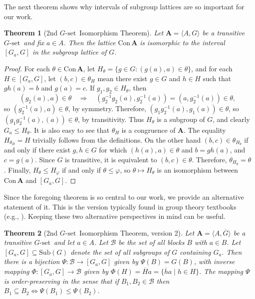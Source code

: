 \documentclass[cm,dissertation,actual,final]{uhthesis}
\theoremstyle{plain}
\newtheorem{theorem}{Theorem}[section]
\theoremstyle{definition}
\theoremstyle{remark}
\numberwithin{theorem}{section}
\numberwithin{claim}{chapter}
\numberwithin{equation}{section}
\numberwithin{conjecture}{chapter}
\newcommand{\<}{\ensuremath{\langle}}
\renewcommand{\>}{\ensuremath{\rangle}}
\renewcommand{\leq}{\ensuremath{\leqslant}}
\newcommand{\Con}{\ensuremath{\mathrm{Con\,}}}
\newcommand{\Sub}{\ensuremath{\mathrm{Sub}}}
\newcommand{\0}{\ensuremath{\mathbf{0}}}
\newcommand{\1}{\ensuremath{\mathbf{1}}}
\newcommand{\2}{\ensuremath{\mathbf{2}}}
\newcommand{\3}{\ensuremath{\mathbf{3}}}
\newcommand{\4}{\ensuremath{\mathbf{4}}}
\newcommand{\5}{\ensuremath{\mathbf{5}}}
\newcommand{\bA}{\ensuremath{\mathbf{A}}}
\newcommand{\sB}{\ensuremath{\mathscr{B}}}
\newcommand{\barG}{\ensuremath{\overline{G}}}
\newcommand{\barH}{\ensuremath{\overline{H}}}
\newcommand{\barh}{\ensuremath{\overline{h}}}
\newcommand{\stab}[1]{\ensuremath{G_{#1}}}
\newcommand{\Gset}{\ensuremath{G\text{-set}}}
\renewcommand{\phi}{\ensuremath{\varphi}}
\begin{document}
The next theorem shows why intervals of subgroup lattices are so important for
our work.
\begin{theorem}[2nd \Gset\ Isomorphism Theorem]
\label{thm:g-set-isomorphism2}
  Let $\bA = \<A, G\>$ be a transitive \Gset\ and fix $a\in A$.  
  Then the lattice $\Con \bA$ is isomorphic to the
  interval $[G_a, G]$ in the subgroup lattice of $G$.
\end{theorem}
\begin{proof}
    For each $\theta  \in \Con \bA$, let $H_\theta =\{g\in G : (g(a),a) \in
    \theta\}$,  
    and for each $H \in [G_a, G]$, let 
    $(b, c) \in \theta_H$ mean there exist $g \in G$ and $h \in H$ 
    such that $gh(a) = b$ and $g(a) =c$. 
    If $g_1, g_2 \in H_\theta$, then 
    \[
    (g_2(a), a) \in \theta \quad \Rightarrow \quad (g_2^{-1} g_2(a), g_2^{-1}(a)) =
    (a, g_2^{-1}(a)) \in \theta,
    \]
    so $(g_2^{-1}(a), a) \in \theta$, by symmetry.  Therefore,
    $(g_1g_2^{-1} (a), g_1 (a)) \in \theta$, so 
    $(g_1g_2^{-1} (a), (a)) \in \theta$, by transitivity. Thus $H_\theta$ is a
    subgroup of 
    $G$, and clearly  $G_a \leq H_\theta$. 
    It is also easy to see that $\theta_H$ is a congruence of $\bA$.
    The equality $H_{\theta_H}=H$ trivially follows from the definitions. 
    On the other hand $(b, c) \in \theta_{H_\theta}$ if and only if there exist 
    $g, h\in G$ for which $(h(a),a) \in \theta$ and
    $b = gh(a)$, and $c = g(a)$. Since $G$ is transitive, it is equivalent 
    to $(b, c) \in \theta$.
    Therefore, $\theta_{H_\theta} = \theta$. Finally, $H_\theta \leq H_\phi$ if
    and only if
    $\theta \leq \phi$, so $\theta \mapsto H_\theta$ is an isomorphism
    between $\Con \bA$ and $[G_a, G]$.
\end{proof}

Since the foregoing theorem is so central to our work, we provide an alternative 
statement of it. This is the version typically found in group theory 
textbooks (e.g., \cite{Dixon:1996}).  Keeping these two alternative perspectives in
mind can be useful.

  \begin{theorem}[2nd \Gset\ Isomorphism Theorem, version 2]
    Let $\bA = \<A, \barG\>$ be a transitive \Gset\
    and let $a \in A$. Let $\sB$ be the set of all blocks $B$ with $a\in B$.
    Let $[\stab{a},G] \subseteq \Sub(G)$ denote the set of all subgroups of 
    $G$ containing $\stab{a}$.  Then there is a
    bijection $\Psi :\sB \rightarrow [\stab{a},G]$ given by $\Psi(B)= G(B)$,
    with inverse mapping $\Phi: [\stab{a},G] \rightarrow \sB $ 
    given by $\Phi(H) = \barH a = \{\barh a  \mid  h\in H\}$. 
    The mapping $\Psi$ is order-preserving in the sense
    that if $B_1, B_2 \in  \sB$ then 
    $B_1\subseteq B_2 \Leftrightarrow \Psi(B_1) \leq \Psi(B_2)$.
  \end{theorem}
\end{document}
